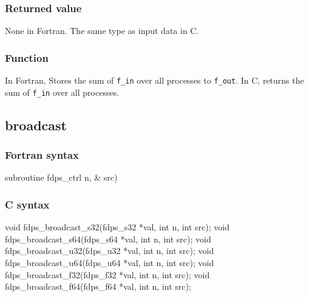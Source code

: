 \subsubsection*{Returned value}
None in Fortran. The same type as input data in C.

\subsubsection*{Function}
In Fortran, Stores the sum of {\tt f\_in} over all processes to \texttt{f\_out}. In C, returns the sum of \texttt{f\_in} over all processes.
\clearpage

\subsection{broadcast}
\subsubsection*{Fortran syntax}
\begin{screen}
\begin{spverbatim}
 subroutine fdps_ctrl%
                                n,   &
                                src)
\end{spverbatim}
\end{screen}

\subsubsection*{C syntax}
\begin{screen}
\begin{spverbatim}
void fdps_broadcast_s32(fdps_s32 *val, int n, int src);
void fdps_broadcast_s64(fdps_s64 *val, int n, int src);
void fdps_broadcast_u32(fdps_u32 *val, int n, int src);
void fdps_broadcast_u64(fdps_u64 *val, int n, int src);
void fdps_broadcast_f32(fdps_f32 *val, int n, int src);
void fdps_broadcast_f64(fdps_f64 *val, int n, int src);
\end{spverbatim}
\end{screen}

